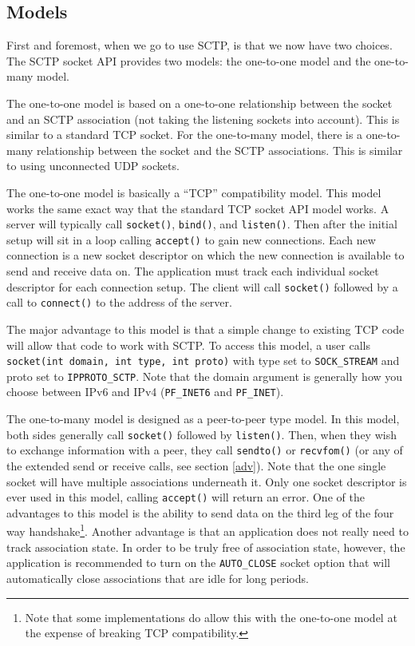 \documentclass[conference]{IEEEtran}
\begin{document}
\subsection{Models}
First and foremost, when we go to use SCTP, is that we now have two choices.
The SCTP socket API provides two models: the one-to-one model and the
one-to-many model.

The one-to-one model is based on a one-to-one relationship between the socket and
an SCTP association (not taking the listening sockets into account). This is similar to
a standard TCP socket.
For the one-to-many model, there is a one-to-many relationship between the socket
and the SCTP associations. This is similar to using unconnected UDP sockets.

The one-to-one model is basically a ``TCP'' compatibility model. This model
works the same exact way that the standard TCP socket API model works.
A server will typically call \texttt{socket()}, \texttt{bind()}, and \texttt{listen()}. Then after
the initial setup will sit in a loop calling \texttt{accept()} to gain new connections.
Each new connection is a new socket descriptor on which the new connection is
available to send and receive data on. The application must track each individual socket
descriptor for each connection setup.  The client will call \texttt{socket()} followed
by a call to \texttt{connect()} to the address of the server. 

The major advantage to this model is that a simple change to 
existing TCP code will allow that code to work with SCTP. To access this model, a user
calls \texttt{socket(int domain,  int type, int proto)}
with type set to \texttt{SOCK\_STREAM} and proto set to \texttt{IPPROTO\_SCTP}. 
Note that the domain argument is generally how you choose between IPv6 
and IPv4 (\texttt{PF\_INET6} and \texttt{PF\_INET}).

The one-to-many model is designed as a peer-to-peer type model.
In this model, both sides generally call \texttt{socket()} followed by \texttt {listen()}.
Then, when they wish to exchange information
with a peer, they call \texttt{sendto()} or \texttt{recvfom()} (or any of the extended send or
receive calls, see section \ref{adv}). Note that the one single socket will have multiple
associations underneath it. Only one socket descriptor is ever used
in this model, calling \texttt{accept()} will return an error.
One of the advantages to this model is the ability to send data on the third leg
of the four way handshake\footnote{Note that some implementations do allow this with
the one-to-one model at the expense of breaking TCP compatibility.}.
Another advantage is that an application does not really need to track association state.
In order to be truly free of association state, however, the application is recommended
to turn on the \texttt{AUTO\_CLOSE} socket option that will automatically close associations
that are idle for long periods. 
\end{document}
